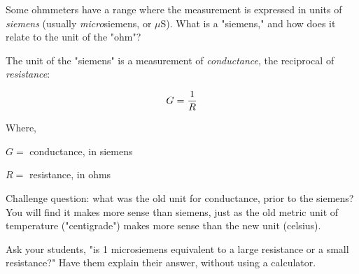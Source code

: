 

Some ohmmeters have a range where the measurement is expressed in units of {\it siemens} (usually {\it micro}siemens, or $\mu$S).  What is a "siemens," and how does it relate to the unit of the "ohm"?







The unit of the "siemens" is a measurement of {\it conductance}, the reciprocal of {\it resistance}:

$$G = {1 \over R}$$

\noindent
Where,

$G = $ conductance, in siemens

$R = $ resistance, in ohms

\vskip 10pt

Challenge question: what was the old unit for conductance, prior to the siemens?  You will find it makes more sense than siemens, just as the old metric unit of temperature ("centigrade") makes more sense than the new unit (celsius).







Ask your students, "is 1 microsiemens equivalent to a large resistance or a small resistance?"  Have them explain their answer, without using a calculator.




